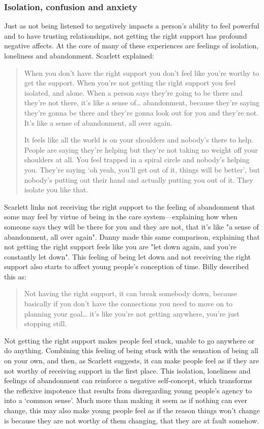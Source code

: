 \subsubsection{Isolation, confusion and anxiety}
Just as not being listened to negatively impacts a person's ability to feel powerful and to have trusting relationships, not getting the right support has profound negative affects. At the core of many of these experiences are feelings of isolation, loneliness and abandonment. Scarlett explained:
\begin{quote}
When you don’t have the right support you don’t feel like you’re worthy to get the support. When you’re not getting the right support you feel isolated, and alone. When a person says they’re going to be there and they’re not there, it’s like a sense of… abandonment, because they’re saying they’re gonna be there and they’re gonna look out for you and they’re not. It’s like a sense of abandonment, all over again. 

It feels like all the world is on your shoulders and nobody’s there to help. People are saying they’re helping but they’re not taking no weight off your shoulders at all. You feel trapped in a spiral circle and nobody’s helping you. They’re saying ‘oh yeah, you’ll get out of it, things will be better’, but nobody’s putting out their hand and actually putting you out of it. They isolate you like that.
\end{quote}
Scarlett links not receiving the right support to the feeling of abandonment that some may feel by virtue of being in the care system—explaining how when someone says they will be there for you and they are not, that it's like "a sense of abandonment, all over again". Danny made this same comparison, explaining that not getting the right support feels like you are "let down again, and you're constantly let down". This feeling of being let down and not receiving the right support also starts to affect young people’s conception of time. Billy described this as:
\begin{quote}
Not having the right support, it can break somebody down, because basically if you don’t have the connections you need to move on to planning your goal… it’s like you’re not getting anywhere, you’re just stopping still.
\end{quote}
Not getting the right support makes people feel stuck, unable to go anywhere or do anything. Combining this feeling of being stuck with the sensation of being all on your own, and then, as Scarlett suggests, it can make people feel as if they are not worthy of receiving support in the first place. This isolation, loneliness and feelings of abandonment can reinforce a negative self-concept, which transforms the reflexive impotence that results from disregarding young people’s agency to into a ‘common sense’. Much more than making it seem as if nothing can ever change, this may also make young people feel as if the reason things won’t change is because they are not worthy of them changing, that they are at fault somehow. 

